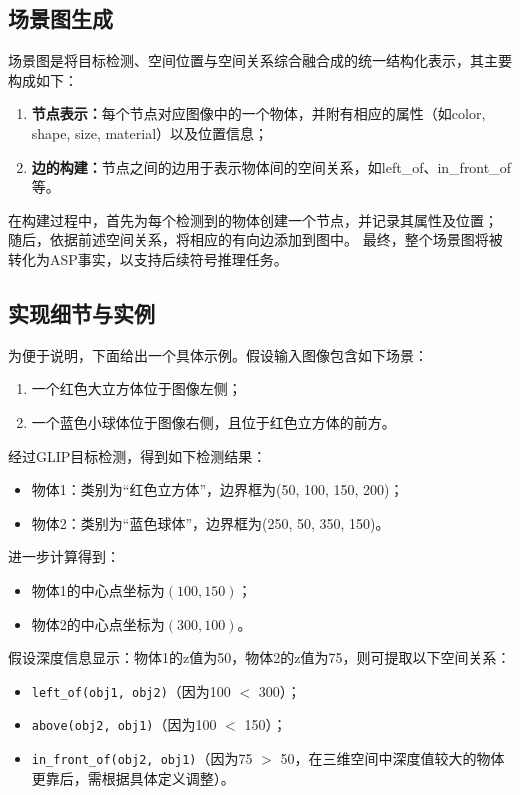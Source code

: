 \subsection{场景图生成}
场景图是将目标检测、空间位置与空间关系综合融合成的统一结构化表示，其主要构成如下： 
\begin{enumerate}[label=(\arabic*),itemsep=0.5em] 
    \item \textbf{节点表示：}每个节点对应图像中的一个物体，并附有相应的属性（如color, shape, size, material）以及位置信息； 
    \item \textbf{边的构建：}节点之间的边用于表示物体间的空间关系，如left\_of、in\_front\_of等。 
\end{enumerate}

在构建过程中，首先为每个检测到的物体创建一个节点，并记录其属性及位置；
随后，依据前述空间关系，将相应的有向边添加到图中。
最终，整个场景图将被转化为ASP事实，以支持后续符号推理任务。
\subsection{实现细节与实例}
为便于说明，下面给出一个具体示例。假设输入图像包含如下场景： 
\begin{enumerate}[label=(\arabic*),itemsep=0.5em] 
    \item 一个红色大立方体位于图像左侧； 
    \item 一个蓝色小球体位于图像右侧，且位于红色立方体的前方。 
\end{enumerate}

经过GLIP目标检测，得到如下检测结果： 
\begin{itemize}[leftmargin=2em] 
    \item 物体1：类别为“红色立方体”，边界框为(50, 100, 150, 200)； 
    \item 物体2：类别为“蓝色球体”，边界框为(250, 50, 350, 150)。 
\end{itemize}

进一步计算得到： 
\begin{itemize}[leftmargin=2em] 
    \item 物体1的中心点坐标为$(100,150)$； 
    \item 物体2的中心点坐标为$(300,100)$。 
\end{itemize}

假设深度信息显示：物体1的z值为50，物体2的z值为75，则可提取以下空间关系： 
\begin{itemize}[leftmargin=2em] 
    \item \texttt{left\_of(obj1, obj2)}（因为100 $<$ 300）； 
    \item \texttt{above(obj2, obj1)}（因为100 $<$ 150）； 
    \item \texttt{in\_front\_of(obj2, obj1)}（因为75 $>$ 50，在三维空间中深度值较大的物体更靠后，需根据具体定义调整）。 
\end{itemize}

